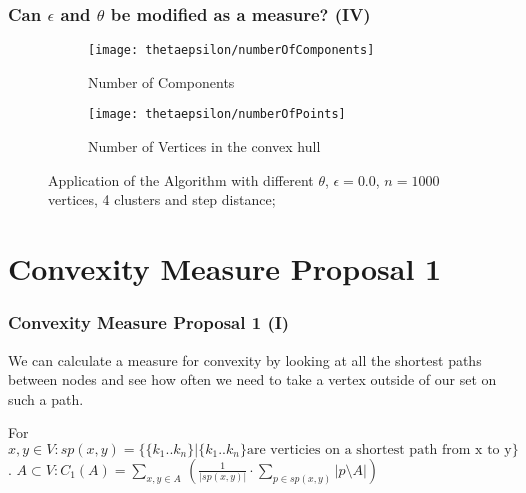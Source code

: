 \documentclass[
    11pt, %
    aspectratio=169, %
    handout
]{beamer}
\begin{document}
\begin{frame}
\frametitle{Can $\epsilon$ and $\theta$ be modified as a measure? (IV)}
\begin{figure}
\centering
\begin{subfigure}{0.4\textwidth}
    \texttt{[image: thetaepsilon/numberOfComponents]}
    \caption{Number of Components}
    \label{fig:first}
\end{subfigure}
\hfill
\begin{subfigure}{0.4\textwidth}
    \texttt{[image: thetaepsilon/numberOfPoints]}
    \caption{Number of Vertices in the convex hull}
    \label{fig:second}
\end{subfigure}
\caption{Application of the Algorithm with different $\theta$, $\epsilon=0.0$,  $n=1000$ vertices, 4 clusters  and step distance;}
\end{figure}
\end{frame}
\section{Convexity Measure Proposal 1}
\begin{frame}
\frametitle{Convexity Measure Proposal 1 (I)}
We can calculate a measure for convexity by looking at all the shortest paths between nodes and see how often we need to take a vertex outside of our set on such a path. \par
\pause
For $x,y \in V: sp(x,y)=\{ \{k_1..k_n\} | \{k_1..k_n\} \text{are verticies on a shortest path from x to y} \}$. \newline
$A \subset V: C_1(A)=\underset{x,y \in A~}{\sum} ( \frac{1}{|sp(x,y)|} \cdot \underset{p \in sp(x,y)}{\sum} |p\setminus A| )$
\pause
\begin{center}
\end{center}
\end{frame}
\end{document}
